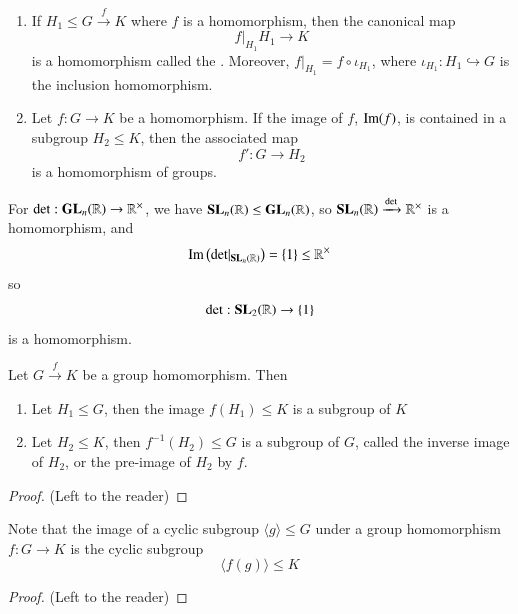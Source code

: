 \documentclass[12pt, a4paper, oneside, openright, titlepage]{book}
\begin{document}
\begin{rmk}
    \leavevmode
    \begin{enumerate}
        \item If $H_1 \leq G\xrightarrow{f} K$ where $f$ is a homomorphism, then the canonical map \begin{equation}
            f\rvert_{H_1}H_1\rightarrow K
        \end{equation}
        is a homomorphism called the . Moreover, $f\rvert_{H_1} = f \circ \iota_{H_1}$, where $\iota_{H_1}:H_1\hookrightarrow G$ is the inclusion homomorphism.
        \item Let $f:G\rightarrow K$ be a homomorphism. If the image of $f$, $\operatorname{Im}(f)$, is contained in a subgroup $H_2 \leq K$, then the associated map \begin{equation}
            f':G\rightarrow H_2
        \end{equation}
        is a homomorphism of groups.
    \end{enumerate}
\end{rmk}

\begin{eg}
    For $\det:\mathbf{GL}_n(\mathbb R)\rightarrow \mathbb R^{\times}$, we have $\mathbf{SL}_n(\mathbb R) \leq \mathbf{GL}_n(\mathbb R)$, so $\mathbf{SL}_n(\mathbb R)\xrightarrow{\det}\mathbb R^{\times}$ is a homomorphism, and \begin{equation}
        \operatorname{Im}\left(\det\rvert_{\mathbf{SL}_n(\mathbb R)}\right) = \{1\} \leq \mathbb R^{\times}
    \end{equation}
    so \begin{equation}
        \det:\mathbf{SL}_2(\mathbb R)\rightarrow \{1\}
    \end{equation}
    is a homomorphism.
\end{eg}


\begin{prop}
    Let $G\xrightarrow{f} K$ be a group homomorphism. Then \begin{enumerate}
        \item Let $H_1 \leq G$, then the image $f(H_1) \leq K$ is a subgroup of $K$
        \item Let $H_2 \leq K$, then $f^{-1}(H_2) \leq G$ is a subgroup of $G$, called the inverse image of $H_2$, or the pre-image of $H_2$ by $f$.
    \end{enumerate}
\end{prop}
\begin{proof}
    (Left to the reader)
\end{proof}


\begin{rmk}
        Note that the image of a cyclic subgroup $\langle g \rangle \leq G$ under a group homomorphism $f: G \rightarrow K$ is the cyclic subgroup \begin{equation}
                \langle f(g) \rangle \leq K
        \end{equation}
\end{rmk}
\begin{proof}
        (Left to the reader)
\end{proof}
\end{document}

